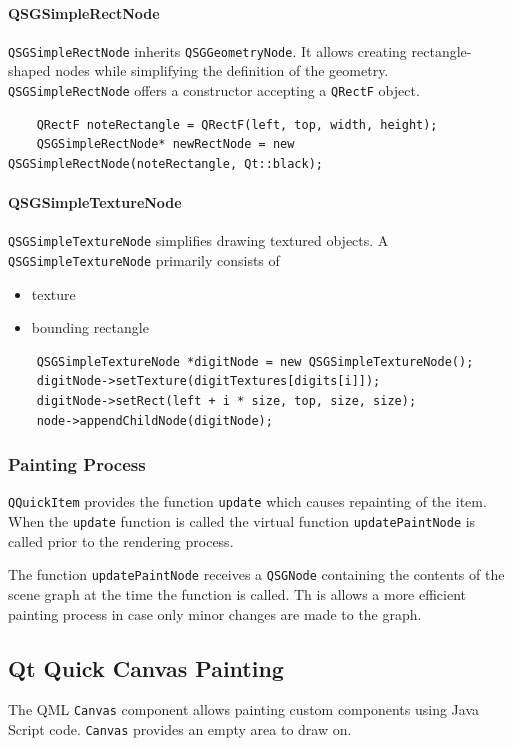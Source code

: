 \paragraph{QSGSimpleRectNode}
{\tt QSGSimpleRectNode} inherits {\tt QSGGeometryNode}. It allows creating rectangle-shaped nodes while simplifying the definition of the geometry. 
{\tt QSGSimpleRectNode} offers a constructor accepting a {\tt QRectF} object.

\begin{lstlisting}
	QRectF noteRectangle = QRectF(left, top, width, height);
	QSGSimpleRectNode* newRectNode = new QSGSimpleRectNode(noteRectangle, Qt::black);
\end{lstlisting}

\paragraph{QSGSimpleTextureNode}
{\tt QSGSimpleTextureNode} simplifies drawing textured objects. A {\tt QSGSimpleTextureNode} primarily consists of 
\begin{itemize}
	\item{texture}
	\item{bounding rectangle}
\end{itemize}

\begin{lstlisting}
	QSGSimpleTextureNode *digitNode = new QSGSimpleTextureNode();
	digitNode->setTexture(digitTextures[digits[i]]);
	digitNode->setRect(left + i * size, top, size, size);
	node->appendChildNode(digitNode);
\end{lstlisting}

\subsubsection{Painting Process}
{\tt QQuickItem} provides the function {\tt update} which causes repainting of the item. 
When the {\tt update} function is called the virtual function {\tt updatePaintNode} is called prior to the rendering process. 

The function {\tt updatePaintNode} receives a {\tt QSGNode} containing the contents of the scene graph at the time the function is called. Th
is allows a more efficient painting process in case only minor changes are made to the graph.

\subsection{Qt Quick Canvas Painting}
The QML {\tt Canvas} component allows painting custom components using Java Script code. 
{\tt Canvas} provides an empty area to draw on.

